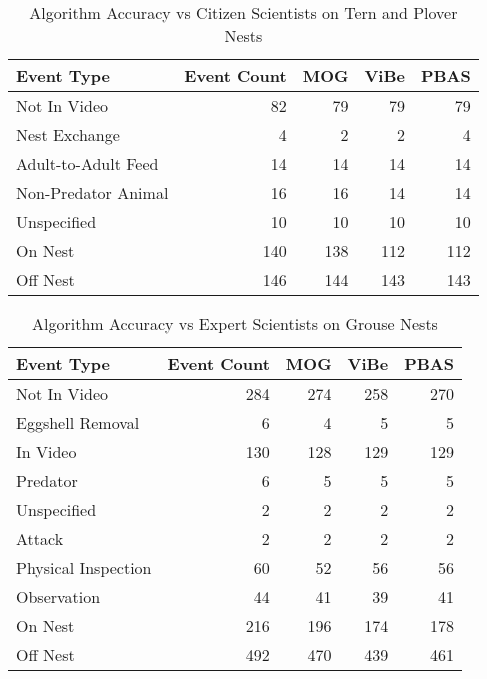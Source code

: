 \begin{table}
\centering
\caption{Algorithm Accuracy vs Citizen Scientists on Tern and Plover Nests}
\label{table:algorithm_accuracy_users}
\begin{tabular}{lrrrr}
    \toprule
    Event Type & Event Count & MOG & ViBe & PBAS\\
    \midrule
    Not In Video & 82 & 79 & 79 & 79\\
    Nest Exchange & 4 & 2 & 2 & 4\\
    Adult-to-Adult Feed & 14 & 14 & 14 & 14\\
    Non-Predator Animal & 16 & 16 & 14 & 14\\
    Unspecified & 10 & 10 & 10 & 10\\
    On Nest & 140 & 138 & 112 & 112\\
    Off Nest & 146 & 144 & 143 & 143\\
    \bottomrule
\end{tabular}
\end{table}


\begin{table}
\centering
\caption{Algorithm Accuracy vs Expert Scientists on Grouse Nests}
\label{table:algorithm_accuracy_grouse_experts}
\begin{tabular}{lrrrr}
    \toprule
    Event Type & Event Count & MOG & ViBe & PBAS\\
    \midrule
    Not In Video & 284 & 274 & 258 & 270\\
    Eggshell Removal & 6 & 4 & 5 & 5\\
    In Video & 130 & 128 & 129 & 129\\
    Predator & 6 & 5 & 5 & 5\\
    Unspecified & 2 & 2 & 2 & 2\\
    Attack & 2 & 2 & 2 & 2\\
    Physical Inspection & 60 & 52 & 56 & 56\\
    Observation & 44 & 41 & 39 & 41\\
    On Nest & 216 & 196 & 174 & 178\\
    Off Nest & 492 & 470 & 439 & 461\\
    \bottomrule
\end{tabular}
\end{table}

